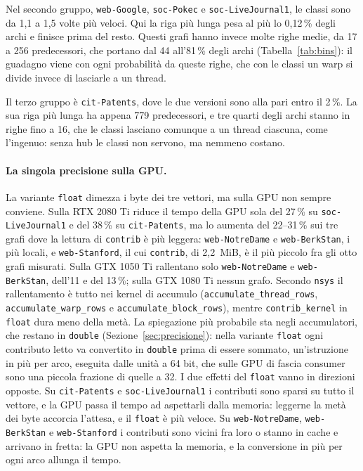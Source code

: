 \documentclass[11pt,a4paper]{article}
\newcommand{\stacco}{\par\medskip\noindent}
\begin{document}
\stacco
Nel secondo gruppo, \texttt{web-Google}, \texttt{soc-Pokec} e
\texttt{soc-LiveJournal1}, le classi sono da 1,1 a 1,5 volte più veloci. Qui
la riga più lunga pesa al più lo 0,12\,\% degli archi e finisce prima del
resto. Questi grafi hanno
invece molte righe medie, da 17 a 256 predecessori, che portano dal 44
all'81\,\% degli archi (Tabella~\ref{tab:bins}): il guadagno viene con ogni
probabilità da queste righe, che con le classi un warp si divide invece di
lasciarle a un thread.

\stacco
Il terzo gruppo è \texttt{cit-Patents}, dove le due versioni sono alla
pari entro il 2\,\%. La sua riga più lunga ha appena 779 predecessori, e tre
quarti degli archi stanno in righe fino a 16, che le classi lasciano comunque
a un thread ciascuna, come l'ingenuo: senza hub le classi non servono, ma
nemmeno costano.

\paragraph{La singola precisione sulla GPU.}
La variante \texttt{float} dimezza i byte dei tre vettori, ma sulla GPU
non sempre conviene. Sulla RTX 2080 Ti riduce il tempo della GPU sola del
27\,\% su \texttt{soc-LiveJournal1} e del 38\,\% su \texttt{cit-Patents}, ma lo
aumenta del 22--31\,\% sui tre grafi dove la lettura di \texttt{contrib} è più
leggera: \texttt{web-NotreDame} e \texttt{web-BerkStan}, i più locali, e
\texttt{web-Stanford}, il cui \texttt{contrib}, di 2,2~MiB, è il più piccolo
fra gli otto grafi misurati. Sulla GTX 1050 Ti rallentano solo
\texttt{web-NotreDame} e \texttt{web-BerkStan}, dell'11 e del 13\,\%; sulla
GTX 1080 Ti nessun grafo. Secondo \texttt{nsys} il rallentamento è tutto nei
kernel di accumulo (\texttt{accumulate\_thread\_rows},
\texttt{accumulate\_warp\_rows} e \texttt{accumulate\_block\_rows}),
mentre \texttt{contrib\_kernel} in \texttt{float} dura meno
della metà. La spiegazione più probabile sta negli accumulatori, che restano in
\texttt{double} (Sezione~\ref{sec:precisione}): nella variante \texttt{float}
ogni contributo letto va convertito in \texttt{double} prima di essere
sommato, un'istruzione in più per arco, eseguita dalle unità a 64 bit, che
sulle GPU di fascia consumer sono una piccola frazione di quelle a 32. I due
effetti del \texttt{float} vanno in direzioni opposte. Su \texttt{cit-Patents}
e \texttt{soc-LiveJournal1} i contributi sono sparsi su tutto il vettore, e la
GPU passa il tempo ad aspettarli dalla memoria: leggerne la metà dei byte
accorcia l'attesa, e il \texttt{float} è più veloce. Su
\texttt{web-NotreDame}, \texttt{web-BerkStan} e \texttt{web-Stanford} i
contributi sono vicini fra loro o stanno in cache e arrivano in fretta: la GPU
non aspetta la memoria, e la conversione in più per ogni arco allunga il
tempo.
\end{document}
